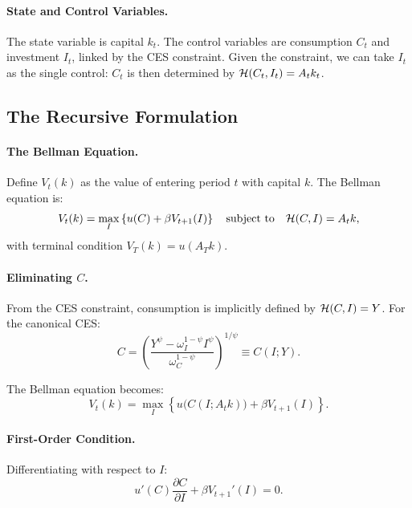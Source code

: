\paragraph{State and Control Variables.}
The state variable is capital $k_t$. The control variables are consumption $C_t$ and investment $I_t$, linked by the CES constraint. Given the constraint, we can take $I_t$ as the single control: $C_t$ is then determined by $\mathcal{H}(C_t, I_t) = A_t k_t$.

\subsection{The Recursive Formulation}
\label{subsec:ac-T-recursive}

\paragraph{The Bellman Equation.}
Define $V_t(k)$ as the value of entering period $t$ with capital $k$. The Bellman equation is:
\begin{equation}
V_t(k) = \max_{I} \left\{ u(C) + \beta V_{t+1}(I) \right\} \quad \text{subject to} \quad \mathcal{H}(C, I) = A_t k,
\label{eq:ac-T-bellman}
\end{equation}
with terminal condition $V_T(k) = u(A_T k)$.

\paragraph{Eliminating $C$.}
From the CES constraint, consumption is implicitly defined by $\mathcal{H}(C, I) = Y$. For the canonical CES:
\begin{equation}
C = \left( \frac{Y^\psi - \omega_I^{1-\psi} I^\psi}{\omega_C^{1-\psi}} \right)^{1/\psi} \equiv C(I; Y).
\label{eq:ac-T-C-implicit}
\end{equation}

The Bellman equation becomes:
\begin{equation}
V_t(k) = \max_{I} \left\{ u\bigl(C(I; A_t k)\bigr) + \beta V_{t+1}(I) \right\}.
\label{eq:ac-T-bellman-reduced}
\end{equation}

\paragraph{First-Order Condition.}
Differentiating with respect to $I$:
\begin{equation}
u'(C) \frac{\partial C}{\partial I} + \beta V_{t+1}'(I) = 0.
\label{eq:ac-T-foc}
\end{equation}

